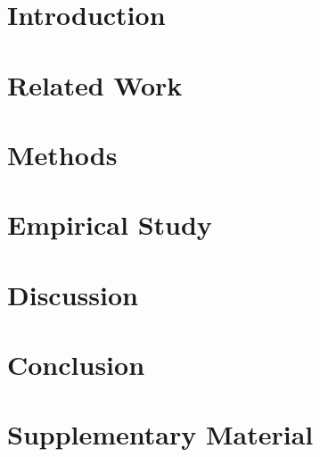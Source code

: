 \documentclass[11pt,a4paper]{article}
\begin{document}
\begin{abstract}
We further extend the framework to CBOE Volatility Index (VIX) and VXX log returns, demonstrating that the CHMM captures the distinct statistical properties of volatility indices (including stronger mean reversion, positive skewness, and pronounced regime structure).
The VIX regime decomposition provides a natural bridge to option pricing: median VIX levels per decoded regime define a volatility map that drives regime-switching geometric Brownian motion paths.
A parametric stochastic-volatility comparison against the resulting implied volatility surface is the subject of companion work and is deliberately outside the scope of this paper.

\bigskip\noindent
\textbf{Keywords:} Continuous Hidden Markov Model, Baum-Welch Algorithm, Stylized Facts, Volatility Clustering, Regime-Switching, Synthetic Financial Data, Single Index Model, Copula Dependence, Cross-Asset Simulation, VIX.
\end{abstract}

\section{Introduction}
\label{sec:introduction}


\section{Related Work}
\label{sec:related}


\section{Methods}
\label{sec:methods}


\section{Empirical Study}
\label{sec:results}


\section{Discussion}
\label{sec:discussion}


\section{Conclusion}
\label{sec:conclusion}





\appendix
\section{Supplementary Material}
\label{sec:supplemental}

\end{document}
